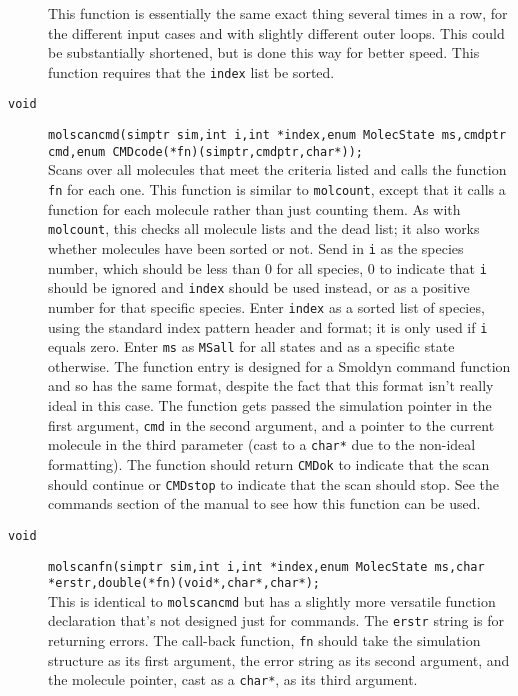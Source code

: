 \documentclass {scrbook}
\newcommand {\ttt} {\texttt}
\begin{document}
\begin{description}
This function is essentially the same exact thing several times in a row, for the different input cases and with slightly different outer loops. This could be substantially shortened, but is done this way for better speed. This function requires that the \ttt{index} list be sorted.

\item[\ttt{void}]
\ttt{molscancmd(simptr sim,int i,int *index,enum MolecState ms,cmdptr cmd,enum CMDcode(*fn)(simptr,cmdptr,char*));}
\hfill \\
Scans over all molecules that meet the criteria listed and calls the function \ttt{fn} for each one. This function is similar to \ttt{molcount}, except that it calls a function for each molecule rather than just counting them. As with \ttt{molcount}, this checks all molecule lists and the dead list; it also works whether molecules have been sorted or not. Send in \ttt{i} as the species number, which should be less than 0 for all species, 0 to indicate that \ttt{i} should be ignored and \ttt{index} should be used instead, or as a positive number for that specific species. Enter \ttt{index} as a sorted list of species, using the standard index pattern header and format; it is only used if \ttt{i} equals zero. Enter \ttt{ms} as \ttt{MSall} for all states and as a specific state otherwise. The function entry is designed for a Smoldyn command function and so has the same format, despite the fact that this format isn't really ideal in this case. The function gets passed the simulation pointer in the first argument, \ttt{cmd} in the second argument, and a pointer to the current molecule in the third parameter (cast to a \ttt{char*} due to the non-ideal formatting). The function should return \ttt{CMDok} to indicate that the scan should continue or \ttt{CMDstop} to indicate that the scan should stop. See the commands section of the manual to see how this function can be used.

\item[\ttt{void}]
\ttt{molscanfn(simptr sim,int i,int *index,enum MolecState ms,char *erstr,double(*fn)(void*,char*,char*);}
\hfill \\
This is identical to \ttt{molscancmd} but has a slightly more versatile function declaration that's not designed just for commands. The \ttt{erstr} string is for returning errors. The call-back function, \ttt{fn} should take the simulation structure as its first argument, the error string as its second argument, and the molecule pointer, cast as a \ttt{char*}, as its third argument.


\end{description}
\end{document}
